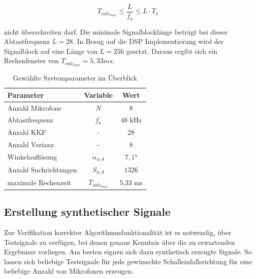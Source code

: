 \begin{equation}
    T_{calc_{max}} \leq \frac{L}{f_a} \leq L \cdot T_a
\end{equation}

nicht überschreiten darf. Die minimale Signalblocklänge beträgt bei dieser Abtastfrequenz $L=28$. In Bezug auf die DSP Implementierung wird der Signalblock auf eine Länge von $L=256$ gesetzt. Daraus ergibt sich ein Rechenfenster von $T_{calc_{max}} = 5,33ms$.



\begin{table}[h]
     \center
     \begin{tabular}{lcc}
     \hline
          Parameter & Variable & Wert \\
           \hline \hline
          Anzahl Mikrofone          & $N$                           & 8     \\
          Abtastfrequenz            & $f_a$                         & 48 kHz      \\
          Anzahl KKF                &  -                             & 28      \\
          Anzahl Varianz            &   -                            & 8       \\
          Winkelauflösung           & $\alpha_{\phi, \theta}$       & $7,1°$       \\
          Anzahl Suchrichtungen      & $S_{\phi,\theta}$             & $1326$        \\
          maximale Rechenzeit       & $T_{calc_{max}}$              & 5,33 ms         \\
         \hline
     \end{tabular}
  \caption{Gewählte Systemparameter im Überblick}
 \label{tab:Systemparameter}
 \end{table}







\subsection{Erstellung synthetischer Signale}
\label{subsec:ErstellungSynthetischerSignale}
Zur Verifikation korrekter Algorithmusfunktionalität ist es notwendig, über Testsignale zu verfügen, bei denen genaue Kenntnis über die zu erwartenden Ergebnisse vorliegen. Am besten eignen sich dazu synthetisch erzeugte Signale. So lassen sich beliebige Testsignale für jede gewünschte Schalleinfallsrichtung für eine beliebige Anzahl von Mikrofonen erzeugen.

